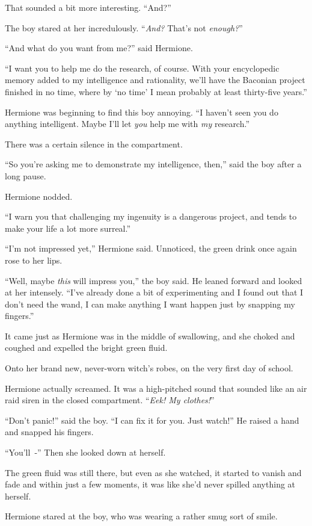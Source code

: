 That sounded a bit more interesting. ``And?''

The boy stared at her incredulously. ``\emph{And?} That's not \emph{enough?}''

``And what do you want from me?'' said Hermione.

``I want you to help me do the research, of course. With your encyclopedic memory added to my intelligence and rationality, we'll have the Baconian project finished in no time, where by `no time' I mean probably at least thirty-five years.''

Hermione was beginning to find this boy annoying. ``I haven't seen you do anything intelligent. Maybe I'll let \emph{you} help me with \emph{my} research.''

There was a certain silence in the compartment.

``So you're asking me to demonstrate my intelligence, then,'' said the boy after a long pause.

Hermione nodded.

``I warn you that challenging my ingenuity is a dangerous project, and tends to make your life a lot more surreal.''

``I'm not impressed yet,'' Hermione said. Unnoticed, the green drink once again rose to her lips.

``Well, maybe \emph{this} will impress you,'' the boy said. He leaned forward and looked at her intensely. ``I've already done a bit of experimenting and I found out that I don't need the wand, I can make anything I want happen just by snapping my fingers.''

It came just as Hermione was in the middle of swallowing, and she choked and coughed and expelled the bright green fluid.

Onto her brand new, never-worn witch's robes, on the very first day of school.

Hermione actually screamed. It was a high-pitched sound that sounded like an air raid siren in the closed compartment. ``\emph{Eek! My clothes!}''

``Don't panic!'' said the boy. ``I can fix it for you. Just watch!'' He raised a hand and snapped his fingers.

``You'll~-'' Then she looked down at herself.

The green fluid was still there, but even as she watched, it started to vanish and fade and within just a few moments, it was like she'd never spilled anything at herself.

Hermione stared at the boy, who was wearing a rather smug sort of smile.

